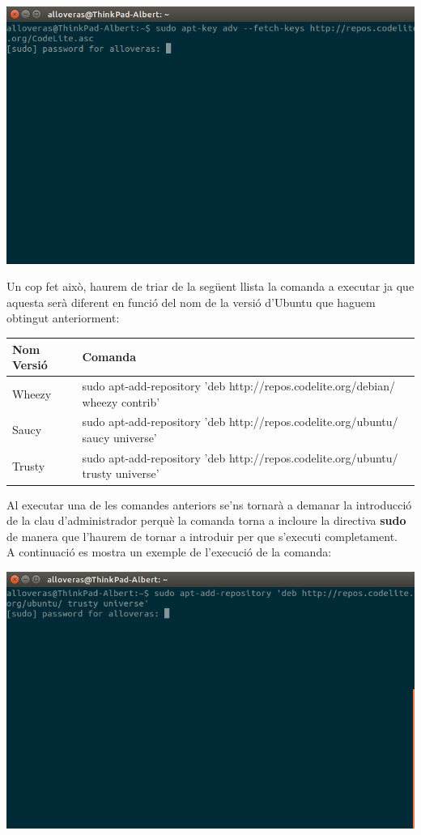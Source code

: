 \documentclass[11pt]{article}
\begin{document}
\begin{center}
	\includegraphics[scale=0.3]{img/Add_Repository_Keys.png}
\end{center}

\pagebreak
\noindent Un cop fet això, haurem de triar de la següent llista la comanda a executar ja que aquesta serà diferent en funció del nom de la versió d'Ubuntu que haguem obtingut anteriorment:

\begin{center}
	\begin{tabular}{||l|l||}
		\hline
		\hline
		Nom Versió & Comanda \\
		\hline
		Wheezy & sudo apt-add-repository 'deb 				http://repos.codelite.org/debian/ wheezy contrib' \\
		\hline
		Saucy & sudo apt-add-repository 'deb http://repos.codelite.org/ubuntu/ saucy universe'\\
		\hline
Trusty & sudo apt-add-repository 'deb http://repos.codelite.org/ubuntu/ trusty universe'\\
		\hline
		\hline
	\end{tabular}
\end{center}

\noindent Al executar una de les comandes anteriors se'ns tornarà a demanar la introducció de la clau d'administrador perquè la comanda torna a incloure la directiva \textbf{sudo} de manera que l'haurem de tornar a introduir per que s'executi completament.\\ A continuació es mostra un exemple de l'execució de la comanda:
\begin{center}
	\includegraphics[scale=0.4]{img/Add_Repository.png}
\end{center}
\end{document}
